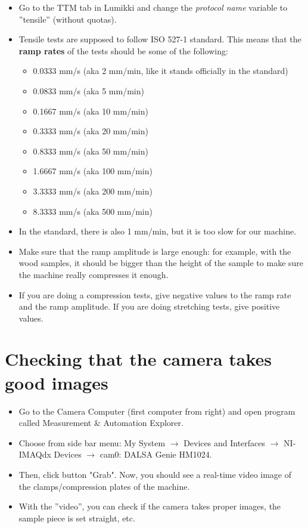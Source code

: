 \documentclass[a4paper]{article}
\begin{document}
\begin{itemize}
  \item Go to the TTM tab in Lumikki and change the \textit{protocol name} variable to ''tensile'' (without quotas).
  \item Tensile tests are supposed to follow ISO 527-1 standard. This means that the \textbf{ramp rates} of the tests should be some of the following:
  \begin{itemize}
    \item 0.0333 mm/s (aka 2 mm/min, like it stands officially in the standard)
    \item 0.0833 mm/s (aka 5 mm/min)
    \item 0.1667 mm/s (aka 10 mm/min)
    \item 0.3333 mm/s (aka 20 mm/min)
    \item 0.8333 mm/s (aka 50 mm/min)
    \item 1.6667 mm/s (aka 100 mm/min)
    \item 3.3333 mm/s (aka 200 mm/min)
    \item 8.3333 mm/s (aka 500 mm/min)
  \end{itemize}
  \item In the standard, there is also 1 mm/min, but it is too slow for our machine.
  \item Make sure that the ramp amplitude is large enough: for example, with the wood samples, it should be bigger than the height of the sample to make sure the machine really compresses it enough.
  \item If you are doing a compression tests, give negative values to the ramp rate and the ramp amplitude. If you are doing stretching tests, give positive values.
\end{itemize}

\section{Checking that the camera takes good images}

\begin{itemize}
  \item Go to the Camera Computer (first computer from right) and open program called Measurement \& Automation Explorer.
  \item Choose from side bar menu: My System $\rightarrow$ Devices and Interfaces $\rightarrow$ NI-IMAQdx Devices $\rightarrow$ cam0: DALSA Genie HM1024.
  \item Then, click button "Grab". Now, you should see a real-time video image of the clamps/compression plates of the machine.
  \item With the ''video'', you can check if the camera takes proper images, the sample piece is set straight, etc.
\end{itemize}
\end{document}
